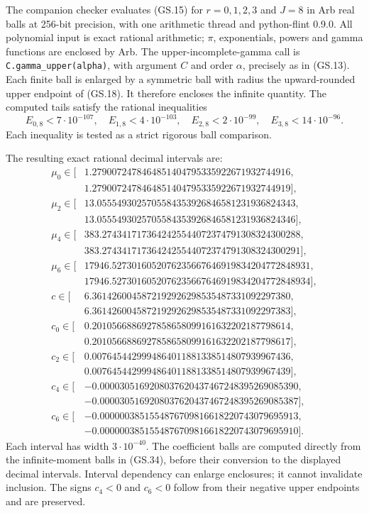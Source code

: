 \documentclass[11pt]{article}
\begin{document}
The companion checker evaluates (GS.15) for $r=0,1,2,3$ and
$J=8$ in Arb real balls at 256-bit precision, with one arithmetic
thread and python-flint 0.9.0. All polynomial input is exact
rational arithmetic; $\pi$, exponentials, powers and gamma functions
are enclosed by Arb. The upper-incomplete-gamma call is
\texttt{C.gamma\_upper(alpha)}, with argument $C$ and order
$\alpha$, precisely as in (GS.13). Each finite ball is enlarged
by a symmetric ball with radius the upward-rounded upper endpoint
of (GS.18). It therefore encloses the infinite quantity.
The computed tails satisfy the rational inequalities
\begin{equation}
 E_{0,8}<7\cdot10^{-107},\quad E_{1,8}<4\cdot10^{-103},\quad
 E_{2,8}<2\cdot10^{-99},\quad E_{3,8}<14\cdot10^{-96}.
 \tag{GS.36}
\end{equation}
Each inequality is tested as a strict rigorous ball comparison.

The resulting exact rational decimal intervals are:
\begin{align*}
 \mu_0\in[&1.2790072478464851404795335922671932744916,\\[-2pt]
           &1.2790072478464851404795335922671932744919],\\
 \mu_2\in[&13.0555493025705584353926846581231936824343,\\[-2pt]
           &13.0555493025705584353926846581231936824346],\\
 \mu_4\in[&383.2743417173642425544072374791308324300288,\\[-2pt]
           &383.2743417173642425544072374791308324300291],\\
 \mu_6\in[&17946.5273016052076235667646919834204772848931,\\[-2pt]
           &17946.5273016052076235667646919834204772848934],\\
 c\in[&6.3614260045872192926298535487331092297380,\\[-2pt]
       &6.3614260045872192926298535487331092297383],\\
 c_0\in[&0.2010566886927858658099161632202187798614,\\[-2pt]
         &0.2010566886927858658099161632202187798617],\\
 c_2\in[&0.0076454429994864011881338514807939967436,\\[-2pt]
         &0.0076454429994864011881338514807939967439],\\
 c_4\in[&-0.0000305169208037620437467248395269085390,\\[-2pt]
         &-0.0000305169208037620437467248395269085387],\\
 c_6\in[&-0.0000003851554876709816618220743079695913,\\[-2pt]
         &-0.0000003851554876709816618220743079695910].
\end{align*}
Each interval has width $3\cdot10^{-40}$. The coefficient balls
are computed directly from the infinite-moment balls in (GS.34),
before their conversion to the displayed decimal intervals. Interval
dependency can enlarge enclosures; it cannot invalidate inclusion.
The signs $c_4<0$ and $c_6<0$ follow from their negative upper
endpoints and are preserved.
\end{document}
